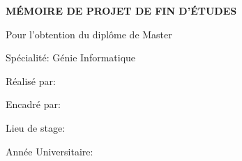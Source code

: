 \begin{titlepage}
    \centering
    
    
    \vspace{1cm}
    
    {\Large \textbf{\university} \par}
    \vspace{0.5cm}
    {\large \faculty \par}
    \vspace{0.5cm}
    {\large \department \par}
    
    \vspace{2cm}
    
    {\Large \textbf{MÉMOIRE DE PROJET DE FIN D'ÉTUDES} \par}
    \vspace{0.5cm}
    {\large Pour l'obtention du diplôme de Master \par}
    \vspace{0.5cm}
    {\large Spécialité: Génie Informatique \par}
    
    \vspace{2cm}
    
    {\Huge \textbf{\reporttitle} \par}
    \vspace{1cm}
    {\Large \textit{\reportsubtitle} \par}
    
    \vspace{2cm}
    
    {\large Réalisé par: \par}
    \vspace{0.5cm}
    {\Large \textbf{\studentname} \par}
    \vspace{0.3cm}
    {\large \studentid \par}
    
    \vspace{1.5cm}
    
    {\large Encadré par: \par}
    \vspace{0.5cm}
    {\Large \textbf{\supervisor} \par}
    
    \vspace{1cm}
    
    {\large Lieu de stage: \par}
    \vspace{0.5cm}
    {\Large \textbf{\company} \par}
    
    \vfill
    
    {\large Année Universitaire: \academicyear \par}
    
\end{titlepage}

\newpage
\thispagestyle{empty}
\mbox{}
